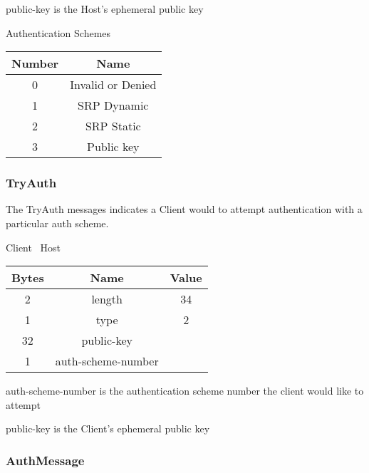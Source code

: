 public-key is the Host's ephemeral public key

\begin{center}
    Authentication Schemes\\
    \begin{tabular}{|c|c|}
        \hline
        \textbf{Number} & \textbf{Name}     \\
        \hline
        0               & Invalid or Denied \\
        \hline
        1               & SRP Dynamic       \\
        \hline
        2               & SRP Static        \\
        \hline
        3               & Public key        \\
        \hline
    \end{tabular}
\end{center}

\subsubsection{TryAuth}

The TryAuth messages indicates a Client would to attempt authentication with a particular auth scheme.

\begin{center}
    Client \textrightarrow\ Host\\
    \begin{tabular}{|c|c|c|}
        \hline
        \textbf{Bytes} & \textbf{Name}      & \textbf{Value} \\
        \hline
        2              & length             & 34             \\
        \hline
        1              & type               & 2              \\
        \hline
        32             & public-key         &                \\
        \hline
        1              & auth-scheme-number &                \\
        \hline
    \end{tabular}
\end{center}

auth-scheme-number is the authentication scheme number the client would like to attempt

public-key is the Client's ephemeral public key

\subsubsection{AuthMessage}

